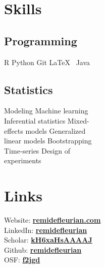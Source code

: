 \documentclass[]{deedy-resume-openfont}
\begin{document}


\begin{minipage}[t]{0.33\textwidth} 

\section{Skills}

\subsection{Programming}
R \textbullet{} 
Python \textbullet{} 
Git \textbullet{} 
\LaTeX\ \textbullet{} 
Java
\sectionsep

\subsection{Statistics}
Modeling \textbullet{} 
Machine learning \textbullet{} \\
Inferential statistics \textbullet{} 
Mixed-\\effects models \textbullet{} 
Generalized \\linear models \textbullet{} 
Bootstrapping \textbullet{} \\
Time-series \textbullet{} 
Design of \\experiments
\sectionsep

\section{Links} 
Website: \href{https://remidefleurian.com}{\bf remidefleurian.com} \\ 
LinkedIn: \href{https://www.linkedin.com/in/remidefleurian/}{\bf remidefleurian} \\
Scholar: \href{https://scholar.google.co.uk/citations?user=kH6xaHsAAAAJ}{\bf kH6xaHsAAAAJ} \\
Github: \href{https://github.com/remidefleurian/}{\bf remidefleurian} \\
OSF: \href{https://osf.io/f2jgd/}{\bf f2jgd}
\sectionsep


\end{minipage}
\end{document}
